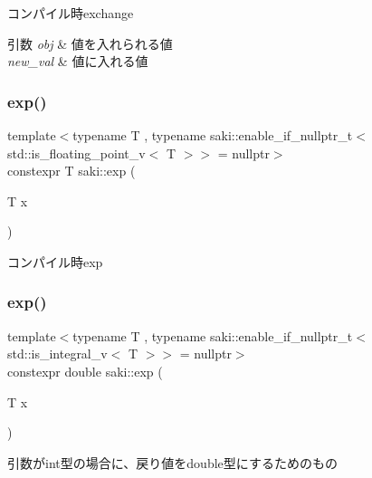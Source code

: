 コンパイル時exchange 


\begin{DoxyParams}{引数}
{\em obj} & 値を入れられる値 \\
\hline
{\em new\+\_\+val} & 値に入れる値 \\
\hline
\end{DoxyParams}
\mbox{\label{namespacesaki_abc1268e543a60d43b04f1418f5ef3e41}} 
\subsubsection{\texorpdfstring{exp()}{exp()}\hspace{0.1cm}{\footnotesize\ttfamily [1/2]}}
{\footnotesize\ttfamily template$<$typename T , typename saki\+::enable\+\_\+if\+\_\+nullptr\+\_\+t$<$ std\+::is\+\_\+floating\+\_\+point\+\_\+v$<$ T $>$$>$  = nullptr$>$ \\
constexpr T saki\+::exp (\begin{DoxyParamCaption}\item[{T}]{x }\end{DoxyParamCaption})}



コンパイル時exp 

\mbox{\label{namespacesaki_ab7883c6dfd2cf3ae04993f64d98345fc}} 
\subsubsection{\texorpdfstring{exp()}{exp()}\hspace{0.1cm}{\footnotesize\ttfamily [2/2]}}
{\footnotesize\ttfamily template$<$typename T , typename saki\+::enable\+\_\+if\+\_\+nullptr\+\_\+t$<$ std\+::is\+\_\+integral\+\_\+v$<$ T $>$$>$  = nullptr$>$ \\
constexpr double saki\+::exp (\begin{DoxyParamCaption}\item[{T}]{x }\end{DoxyParamCaption})}



引数がint型の場合に、戻り値をdouble型にするためのもの 

\mbox{\label{namespacesaki_a2e2d4ba08357bbab05c97ae261c80343}} 
